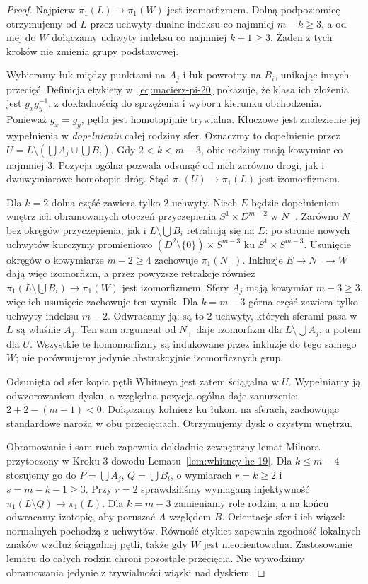 \begin{proof}
Najpierw $\pi_1(L)\to\pi_1(W)$ jest izomorfizmem.
Dolną podpoziomicę otrzymujemy od $L$ przez uchwyty dualne
indeksu co najmniej $m-k\geq3$, a od niej do $W$
dołączamy uchwyty indeksu co najmniej $k+1\geq3$.
Żaden z tych kroków nie zmienia grupy podstawowej.

Wybieramy łuk między punktami na $A_j$ i łuk
powrotny na $B_i$, unikając innych przecięć.
Definicja etykiety w~\eqref{eq:macierz-pi-20}
pokazuje, że klasa ich złożenia jest
$g_xg_y^{-1}$, z dokładnością do sprzężenia i wyboru
kierunku obchodzenia. Ponieważ $g_x=g_y$,
pętla jest homotopijnie trywialna. Kluczowe
jest znalezienie jej wypełnienia w
\emph{dopełnieniu} całej rodziny sfer.
Oznaczmy to dopełnienie przez
$U=L\setminus(\bigcup A_j\cup\bigcup B_i)$.
Gdy $2<k<m-3$, obie rodziny mają kowymiar co najmniej $3$.
Pozycja ogólna pozwala odsunąć od nich zarówno drogi,
jak i dwuwymiarowe homotopie dróg. Stąd
$\pi_1(U)\to\pi_1(L)$ jest izomorfizmem.

Dla $k=2$ dolna część zawiera tylko $2$-uchwyty.
Niech $E$ będzie dopełnieniem wnętrz ich obramowanych
otoczeń przyczepienia $S^1\times D^{m-2}$ w $N_-$.
Zarówno $N_-$ bez okręgów przyczepienia, jak i
$L\setminus\bigcup B_i$ retrahują się na $E$:
po stronie nowych uchwytów kurczymy promieniowo
$(D^2\setminus\{0\})\times S^{m-3}$ ku
$S^1\times S^{m-3}$. Usunięcie okręgów o kowymiarze
$m-2\geq4$ zachowuje $\pi_1(N_-)$.
Inkluzje $E\to N_-\to W$ dają więc izomorfizm,
a przez powyższe retrakcje również
$\pi_1(L\setminus\bigcup B_i)\to\pi_1(W)$
jest izomorfizmem. Sfery $A_j$ mają kowymiar
$m-3\geq3$, więc ich usunięcie zachowuje ten wynik.
Dla $k=m-3$ górna część zawiera tylko uchwyty indeksu
$m-2$. Odwracamy ją: są to $2$-uchwyty, których
sferami pasa w $L$ są właśnie $A_j$. Ten sam argument
od $N_+$ daje izomorfizm dla $L\setminus\bigcup A_j$,
a potem dla $U$. Wszystkie te homomorfizmy są indukowane
przez inkluzje do tego samego $W$; nie porównujemy jedynie
abstrakcyjnie izomorficznych grup.

Odsunięta od sfer kopia pętli Whitneya jest zatem ściągalna
w $U$. Wypełniamy ją odwzorowaniem dysku, a względna pozycja
ogólna daje zanurzenie: $2+2-(m-1)<0$.
Dołączamy kołnierz ku łukom na sferach, zachowując standardowe
naroża w obu przecięciach. Otrzymujemy dysk o czystym wnętrzu.

Obramowanie i sam ruch zapewnia dokładnie zewnętrzny lemat
Milnora przytoczony w Kroku 3 dowodu
Lematu~\ref{lem:whitney-hc-19}.
Dla $k\leq m-4$ stosujemy go do
$P=\bigcup A_j$, $Q=\bigcup B_i$, o wymiarach
$r=k\geq2$ i $s=m-k-1\geq3$.
Przy $r=2$ sprawdziliśmy wymaganą injektywność
$\pi_1(L\setminus Q)\to\pi_1(L)$.
Dla $k=m-3$ zamieniamy role rodzin, a na końcu
odwracamy izotopię, aby poruszać $A$ względem $B$.
Orientacje sfer i ich wiązek normalnych pochodzą z uchwytów.
Równość etykiet zapewnia zgodność lokalnych znaków wzdłuż
ściągalnej pętli, także gdy $W$ jest nieorientowalna.
Zastosowanie lematu do całych rodzin chroni pozostałe przecięcia.
Nie wywodzimy obramowania jedynie z trywialności wiązki nad dyskiem.


\end{proof}
